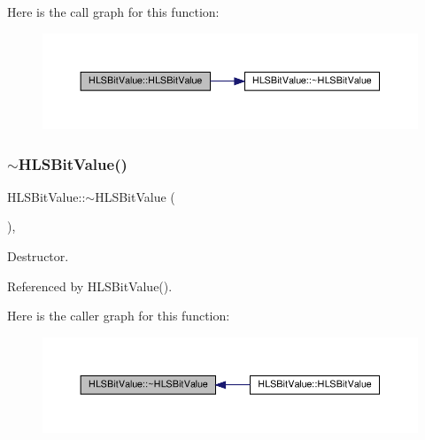 Here is the call graph for this function\+:
\nopagebreak
\begin{figure}[H]
\begin{center}
\leavevmode
\includegraphics[width=350pt]{db/d75/classHLSBitValue_a0953a769ebaf47a3961793524a3ad928_cgraph}
\end{center}
\end{figure}
\mbox{\label{classHLSBitValue_a56220c807963ea620be92b52375cb94f}} 
\subsubsection{\texorpdfstring{$\sim$\+H\+L\+S\+Bit\+Value()}{~HLSBitValue()}}
{\footnotesize\ttfamily H\+L\+S\+Bit\+Value\+::$\sim$\+H\+L\+S\+Bit\+Value (\begin{DoxyParamCaption}{ }\end{DoxyParamCaption})\hspace{0.3cm}{\ttfamily [override]}, {\ttfamily [default]}}



Destructor. 



Referenced by H\+L\+S\+Bit\+Value().

Here is the caller graph for this function\+:
\nopagebreak
\begin{figure}[H]
\begin{center}
\leavevmode
\includegraphics[width=350pt]{db/d75/classHLSBitValue_a56220c807963ea620be92b52375cb94f_icgraph}
\end{center}
\end{figure}


